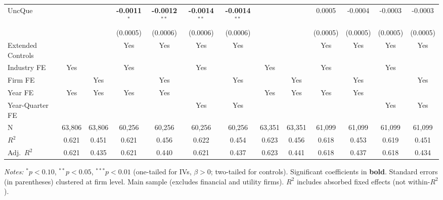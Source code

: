 \documentclass[11pt,a4paper]{article}
\begin{document}
\begin{table}[htbp]
\begin{tabular}{lcccccccccccc}
UncQue &  &  & \textbf{-0.0011}$^{*}$ & \textbf{-0.0012}$^{**}$ & \textbf{-0.0014}$^{**}$ & \textbf{-0.0014}$^{**}$ &  &  & 0.0005 & -0.0004 & -0.0003 & -0.0003 \\
 &  &  & (0.0005) & (0.0006) & (0.0006) & (0.0006) &  &  & (0.0005) & (0.0005) & (0.0005) & (0.0005) \\
\midrule
Extended Controls &  &  & Yes & Yes & Yes & Yes &  &  & Yes & Yes & Yes & Yes \\
Industry FE & Yes &  & Yes &  & Yes &  & Yes &  & Yes &  & Yes &  \\
Firm FE &  & Yes &  & Yes &  & Yes &  & Yes &  & Yes &  & Yes \\
Year FE & Yes & Yes & Yes & Yes &  &  & Yes & Yes & Yes & Yes &  &  \\
Year-Quarter FE &  &  &  &  & Yes & Yes &  &  &  &  & Yes & Yes \\
\midrule
N & 63,806 & 63,806 & 60,256 & 60,256 & 60,256 & 60,256 & 63,351 & 63,351 & 61,099 & 61,099 & 61,099 & 61,099 \\
$R^2$ & 0.621 & 0.451 & 0.621 & 0.456 & 0.622 & 0.454 & 0.623 & 0.456 & 0.618 & 0.453 & 0.619 & 0.451 \\
Adj.~$R^2$ & 0.621 & 0.435 & 0.621 & 0.440 & 0.621 & 0.437 & 0.623 & 0.441 & 0.618 & 0.437 & 0.618 & 0.434 \\
\bottomrule
\end{tabular}
\begin{minipage}{\linewidth}
\vspace{2pt}\scriptsize
\textit{Notes:} $^{*}p<0.10$, $^{**}p<0.05$, $^{***}p<0.01$ (one-tailed for IVs, $\beta > 0$; two-tailed for controls).
 Significant coefficients in \textbf{bold}.
 Standard errors (in parentheses) clustered at firm level.
 Main sample (excludes financial and utility firms).
 $R^2$ includes absorbed fixed effects (not within-$R^2$).
\end{minipage}
\end{table}
\clearpage
\end{document}
